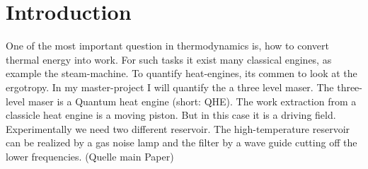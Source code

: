 \documentclass[12pt,a4paper]{article}
\begin{document}
\tableofcontents
\newpage
\section{Introduction}

One of the most important question in thermodynamics is, how to convert thermal energy into work. For such tasks it exist many classical engines, as example the steam-machine. To quantify heat-engines, its commen to look at the ergotropy. In my master-project I will quantify the a three level maser. The three-level maser is a Quantum heat engine (short: QHE).
The work extraction from a classicle heat engine is a moving piston. But in this case it is a driving field.
Experimentally we need two different reservoir. The high-temperature reservoir can be realized by a gas noise lamp and the filter by a wave guide cutting off the lower frequencies.
 (Quelle main Paper)
\end{document}
